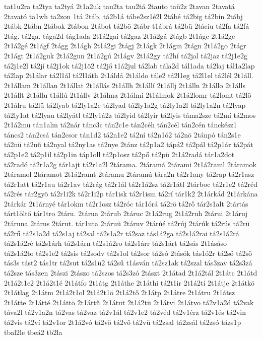 {tat1u2ra
ta2tya
ta2tyá
2t1a2uk
tau2ta
tau2tá
2tauto
taü2z
2tavan
2tavatá
2tavató
ta1wh
ta2zon
1tá
2táb.
tá2b1á
tábe2sz1é2l
2tábé
tá2big
tá2bin
2tábj
2tábk
2tábn
2tábok
2tábon
2tábot
tá2bö
2tábr
t1ábrá
tá2bü
2táciu
tá2fa
tá2fá
2tág.
tá2ga.
tága2d
tág1ada
2t1á2gai
tá2gaz
2t1á2gá
2tágb
2t1ágc
2t1á2ge
2t1á2gé
2t1ágf
2tágg
2t1ágh
2t1á2gi
2tágj
2t1ágk
2t1ágm
2tágn
2t1á2go
2tágr
2t1ágt
2t1á2guk
2t1á2gun
2t1á2gú
2t1ágv
2t1á2gy
tá2hí
tá2jal
tá2jaz
tá2j1e2g
tá2j1e2l
tá2jí
tá2j1ok
tá2j1ö2
tá2jő
t1á2jul
tá2lab
tála2d
tál1ada
tá2laj
tál1a2lap
tá2lap
2t1álar
tá2l1ál
tá2l1áth
2t1áldá
2t1áldo
tále2
tá2l1eg
tá2l1el
tá2lél
2t1áll.
2t1állam
2t1állan
2t1állat
2t1állás
2t1állh
2t1állí
2t1állj
2t1álln
2t1állo
2t1álls
2t1állt
2t1állu
t1állú
2t1állv
2t1álma
2t1álmi
2t1álmok
2t1á2lomr
tá2lomt
tá2lö
2t1álru
tá2lü
tá2lyab
tá2ly1a2c
tá2lyad
tá2ly1a2g
tá2ly1a2l
tá2ly1a2n
tá2lyap
tá2ly1at
tá2lyau
tá2lyátl
tá2ly1á2z
tá2lyid
tá2lyir
tá2lyis
táma2sze
tá2mí
tá2mos
2t1á2mu
tán1alm
tá2nár
tánc3c
tán2c1e
tán2céh
tán2cél
tán2cén
tánckész1
táncs2
tán2csá
tán2csor
tán1d2
tá2n1e2
tá2ní
tá2n1ó2
tá2nö
2tánpó
tán2s1e
tá2nü
tá2nű
tá2nyal
tá2ny1as
tá2nye
2tánz
tá2p1a2
tápá2
tá2pál
tá2p1ár
tá2pát
tá2p1e2
tá2p1il
tá2p1in
táp1oll
tá2p1osz
tá2pő
tá2pü
2t1á2radá
tár1a2dot
tá2radó
tá2r1a2g
tár1ajt
tá2r1a2l
2tárama.
2táramá
2tárami
2t1á2raml
2táramok
2táramol
2táramot
2t1á2ramt
2táramu
2táramú
tára2n
tá2r1any
tá2rap
tá2r1asz
tá2r1att
tá2r1au
tá2r1av
tá2rág
tá2r1ál
tá2r1á2sz
tá2r1átl
2tárboc
tá2r1e2
tá2réd
tá2rés
tár2gyö
tá2r1i2k
tá2r1i2p
tár1isk
tá2r1ism
tá2rí
tár1k2
2t1árkád
2t1árkána
2tárkár
2t1árnyé
tár1okm
tá2r1osz
tá2róc
tár1órá
tá2rö
tá2rő
tár2s1alt
2tártás
tárt1öltő
tár1tro
2táru.
2tárua
2tárub
2táruc
2t1á2rug
2t1á2ruh
2tárui
2t1áruj
2táruna
2tárus
2tárut.
tár1uta
2táruü
2táruv
2tárúé
tá2rúj
2tárúk
tá2rús
tá2rü
tá2rű
tá2s1a2d
tá2s1aj
tá2sal
tá2s1a2r
tá2saz
tás1á2ga
tá2s1á2rai
tá2s1á2rá
tá2s1á2ré
tá2s1árh
tá2s1árn
tá2s1á2ro
tá2s1árr
tá2s1árt
tá2sás
2t1ásáso
tá2s1á2to
tá2s1e2
tá2sis
tá2sodv
tá2s1ol
tá2sor
tá2só
2tásók
tás1ó2r
tá2sö
tá2ső
tás3s
tást2
tás1tr
tá2sut
tá2s1ü2
tá2sű
t1ásván
tá2sz1ak
tá2szal
tás3zav
tá2s3zá
tá2sze
tás3zen
2tászi
2tászo
tá2szos
tá2s3zó
2tászt
2t1átad
2t1á2tál
2t1átc
2t1átd
2t1á2t1e2
2t1á2t1é
2t1átfo
2t1átg
2t1áthe
2t1áthi
tá2t1ir
2t1á2tí
2t1átje
2t1átkö
2t1átlag
2t1átm
2t1á2t1ol
2t1á2t1ö
2t1á2tő
2t1átp
2t1átre
2t1átru
2t1átsz
2t1átte
2t1átté
2t1áttö
2t1áttű
2t1átut
2t1á2tü
2t1átvi
2t1átvo
tá2v1a2d
tá2vak
táva2l
tá2v1a2n
tá2vas
tá2vaz
tá2v1ál
tá2v1e2
tá2véd
tá2v1érz
tá2v1és
tá2vin
tá2vis
tá2ví
tá2v1or
2t1á2vó
tá2vö
tá2vő
tá2vü
tá2zsal
tá2zsál
tá2zsó
tázs1p
tbal2le
tbeá2
tb2la
}
